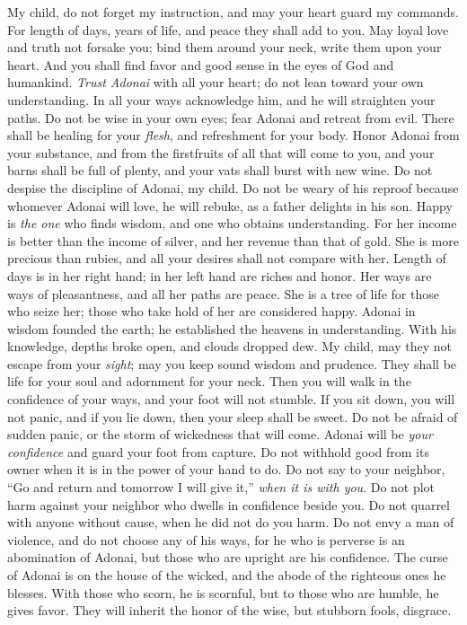 \begin{biblechapter} %
 My child, do not forget my instruction, 
and may your heart guard my commands.
\verse For length of days, years of life, 
and peace they shall add to you.
\verse May loyal love and truth not forsake you; 
bind them around your neck, 
write them upon your heart.
\verse And you shall find favor and good sense 
in the eyes of God and humankind.
\verse \textit{Trust Adonai} with all your heart; 
do not lean toward your own understanding.
\verse In all your ways acknowledge him, 
and he will straighten your paths.
\verse Do not be wise in your own eyes; 
fear Adonai and retreat from evil.
\verse There shall be healing for your \textit{flesh}, 
and refreshment for your body.
\verse Honor Adonai from your substance, 
and from the firstfruits of all that will come to you,
\verse and your barns shall be full of plenty, 
and your vats shall burst with new wine.
 Do not despise the discipline of Adonai, my child. 
Do not be weary of his reproof
\verse because whomever Adonai will love, he will rebuke, 
as a father delights in his son.
\verse Happy is \textit{the one} who finds wisdom, 
and one who obtains understanding.
\verse For her income is better than the income of silver, 
and her revenue than that of gold.
\verse She is more precious than rubies, 
and all your desires shall not compare with her.
\verse Length of days is in her right hand; 
in her left hand are riches and honor.
\verse Her ways are ways of pleasantness, 
and all her paths are peace.
\verse She is a tree of life for those who seize her; 
those who take hold of her are considered happy.
 Adonai in wisdom founded the earth; 
he established the heavens in understanding.
\verse With his knowledge, depths broke open, 
and clouds dropped dew.
\verse My child, may they not escape from your \textit{sight}; 
may you keep sound wisdom and prudence.
\verse They shall be life for your soul 
and adornment for your neck.
\verse Then you will walk in the confidence of your ways, 
and your foot will not stumble.
\verse If you sit down, you will not panic, 
and if you lie down, then your sleep shall be sweet.
\verse Do not be afraid of sudden panic, 
or the storm of wickedness that will come.
\verse Adonai will be \textit{your confidence} 
and guard your foot from capture.
\verse Do not withhold good from its owner 
when it is in the power of your hand to do.
\verse Do not say to your neighbor, 
“Go and return and tomorrow I will give it,” 
\textit{when it is with you}.
\verse Do not plot harm against your neighbor 
who dwells in confidence beside you.
\verse Do not quarrel with anyone without cause, 
when he did not do you harm.
\verse Do not envy a man of violence, 
and do not choose any of his ways,
\verse for he who is perverse is an abomination of Adonai, 
but those who are upright are his confidence.
\verse The curse of Adonai is on the house of the wicked, 
and the abode of the righteous ones he blesses.
\verse With those who scorn, he is scornful, 
but to those who are humble, he gives favor.
\verse They will inherit the honor of the wise, 
but stubborn fools, disgrace.
\end{biblechapter}

